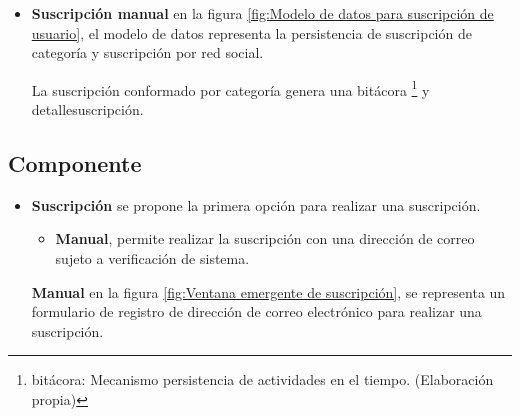 \begin{itemize}

\item \textbf{Suscripción manual} 
en la figura \ref{fig:Modelo de datos para suscripción de usuario}, el modelo de datos
representa la persistencia de suscripción de categoría y suscripción por
red social.

\begin{minipage}{1.0\textwidth}
	\centering
	\label{fig:Modelo de datos para suscripción de usuario}
\end{minipage}

La suscripción conformado por categoría genera una bitácora \footnote{bitácora:
Mecanismo persistencia de actividades en el tiempo. (Elaboración propia)}
y detalle\textunderscore suscripción.

\end{itemize}

\subsection{Componente}

\begin{itemize}

\item \textbf{Suscripción}
se propone la primera opción para realizar una suscripción.

\begin{itemize}

\item \textbf{Manual}, permite realizar la suscripción con una dirección de
correo sujeto a verificación de sistema.

\end{itemize}

\textbf{Manual} en la figura \ref{fig:Ventana emergente de suscripción}, se
representa un formulario de registro de dirección de correo electrónico para
realizar una suscripción. 

\begin{minipage}{1.0\textwidth}
	\centering
	\label{fig:Ventana emergente de suscripción}
\end{minipage}

\end{itemize}
	
